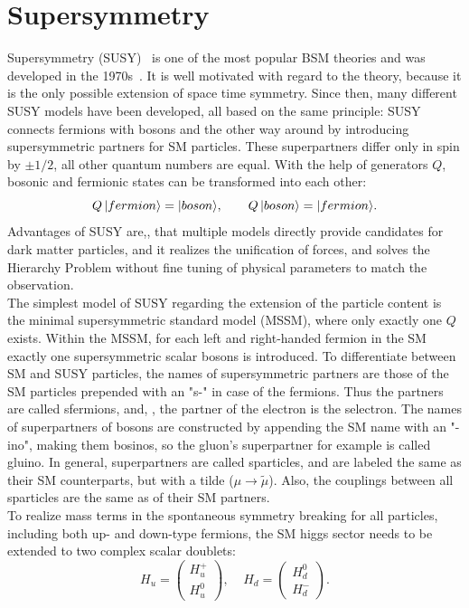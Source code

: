 \section{Supersymmetry}\label{sec:SUSY}
Supersymmetry (SUSY)~\cite{SUSYOriginal,SUSYPrimer} is one of the most popular BSM theories and was developed in the 1970s~\cite{SUSYTheorem,HAAG1975257}. It is well motivated with regard to the theory, because it is the only possible extension of space time symmetry. Since then, many different SUSY models have been developed, all based on the same principle: SUSY connects fermions with bosons and the other way around by introducing supersymmetric partners for SM particles. These superpartners differ only in spin by $\pm1/2$, all other quantum numbers are equal. With the help of generators $Q$, bosonic and fermionic states can be transformed into each other:
\begin{equation}
 Q\,\lvert fermion\rangle=\lvert boson\rangle,~~~~~~ Q\,\lvert boson\rangle=\lvert fermion\rangle.
\end{equation}
Advantages of SUSY are,\eg , that multiple models directly provide candidates for dark matter particles, and it realizes the unification of forces, and solves the Hierarchy Problem without fine tuning of physical parameters to match the observation.\\
The simplest model of SUSY regarding the extension of the particle content is the minimal supersymmetric standard model (MSSM), where only exactly one $Q$ exists. Within the MSSM, for each left and right-handed fermion in the SM exactly one supersymmetric scalar bosons is introduced. To differentiate between SM and SUSY particles, the names of supersymmetric partners are those of the SM particles prepended with an "s-" in case of the fermions. Thus the partners are called sfermions, and, \eg, the partner of the electron is the selectron. The names of superpartners of bosons are constructed by appending the SM name with an "-ino", making them bosinos, so the gluon's superpartner for example is called gluino. In general, superpartners are called sparticles, and are labeled the same as their SM counterparts, but with a tilde (\eg $\mu \to \widetilde{\mu}$). Also, the couplings between all sparticles are the same as of their SM partners.\\
To realize mass terms in the spontaneous symmetry breaking for all particles, including both up- and down-type fermions, the SM higgs sector needs to be extended to two complex scalar doublets:
\begin{equation}
 H_u=  \left(
 \begin{matrix}
  H_u^+ \\
  H_u^0
 \end{matrix}
 \right),~~~~~
 H_d=  \left(
 \begin{matrix}
  H_d^0 \\
  H_d^-
 \end{matrix}
 \right).
\end{equation}

